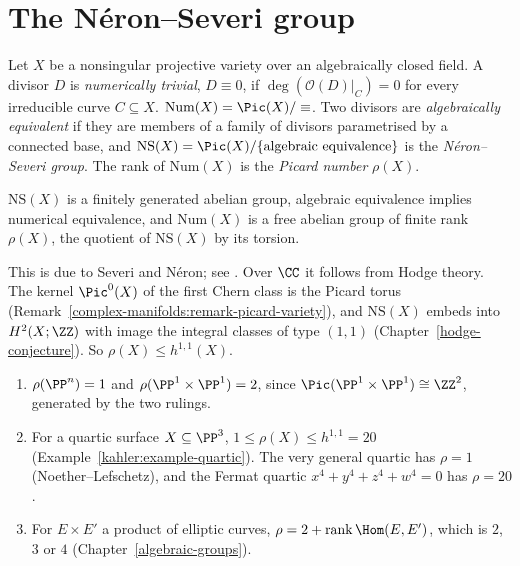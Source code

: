 \section{The N\'eron--Severi group}\label{divisors:section-neron-severi}

\begin{definition}\label{divisors:definition-num}
Let $X$ be a nonsingular projective variety over an algebraically closed field. A divisor $D$ is \emph{numerically trivial}, $D \equiv 0$, if $\deg(\mathcal{O}(D)|_C) = 0$ for every
irreducible curve $C \subseteq X$. $\mathrm{Num}(X) = \Pic(X)/\equiv$. Two divisors are \emph{algebraically equivalent} if they are members of a family of divisors
parametrised by a connected base, and $\mathrm{NS}(X) = \Pic(X)/\{\text{algebraic equivalence}\}$ is the \emph{N\'eron--Severi group}. The rank of $\mathrm{Num}(X)$
is the \emph{Picard number} $\rho(X)$.
\end{definition}

\begin{theorem}\label{divisors:theorem-base}
$\mathrm{NS}(X)$ is a finitely generated abelian group, algebraic equivalence implies numerical equivalence, and $\mathrm{Num}(X)$ is a free abelian group of finite rank
$\rho(X)$, the quotient of $\mathrm{NS}(X)$ by its torsion.
\end{theorem}

This is due to Severi and N\'eron; see \cite[Section 1.1]{lazarsfeld-positivity-1}. Over $\CC$ it follows from Hodge theory. The kernel $\Pic^0(X)$ of the first Chern
class is the Picard torus (Remark~\ref{complex-manifolds:remark-picard-variety}), and $\mathrm{NS}(X)$ embeds into $H^2(X; \ZZ)$ with image the integral classes of type
$(1,1)$ (Chapter~\ref{hodge-conjecture}). So $\rho(X) \leq h^{1,1}(X)$.

\begin{example}\label{divisors:example-picard-numbers}
\begin{enumerate}
\item $\rho(\PP^n) = 1$ and $\rho(\PP^1 \times \PP^1) = 2$, since $\Pic(\PP^1 \times \PP^1) \cong \ZZ^2$, generated by the two rulings.
\item For a quartic surface $X \subseteq \PP^3$, $1 \leq \rho(X) \leq h^{1,1} = 20$ (Example~\ref{kahler:example-quartic}). The very general quartic has $\rho = 1$
(Noether--Lefschetz), and the Fermat quartic $x^4 + y^4 + z^4 + w^4 = 0$ has $\rho = 20$.
\item For $E \times E'$ a product of elliptic curves, $\rho = 2 + \operatorname{rank}\Hom(E, E')$, which is $2$, $3$ or $4$ (Chapter~\ref{algebraic-groups}).
\end{enumerate}
\end{example}

